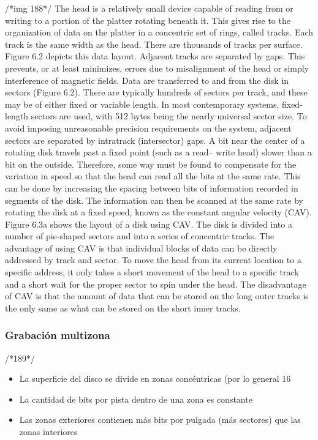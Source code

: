 /*img 188*/
The head is a relatively small device capable of reading from or writing to a portion
of the platter rotating beneath it. This gives rise to the organization of data on the
platter in a concentric set of rings, called tracks. Each track is the same width as the
head. There are thousands of tracks per surface.
Figure 6.2 depicts this data layout. Adjacent tracks are separated by gaps. This
prevents, or at least minimizes, errors due to misalignment of the head or simply
interference of magnetic fields.
Data are transferred to and from the disk in sectors (Figure 6.2). There are
typically hundreds of sectors per track, and these may be of either fixed or variable
length. In most contemporary systems, fixed-length sectors are used, with 512 bytes
being the nearly universal sector size. To avoid imposing unreasonable precision
requirements on the system, adjacent sectors are separated by intratrack (intersector)
gaps.
A bit near the center of a rotating disk travels past a fixed point (such as a read–
write head) slower than a bit on the outside. Therefore, some way must be found
to compensate for the variation in speed so that the head can read all the bits at the
same rate. This can be done by increasing the spacing between bits of information
recorded in segments of the disk. The information can then be scanned at the same
rate by rotating the disk at a fixed speed, known as the constant angular velocity
(CAV). Figure 6.3a shows the layout of a disk using CAV. The disk is divided into
a number of pie-shaped sectors and into a series of concentric tracks. The advantage
of using CAV is that individual blocks of data can be directly addressed by
track and sector. To move the head from its current location to a specific address, it
only takes a short movement of the head to a specific track and a short wait for the
proper sector to spin under the head. The disadvantage of CAV is that the amount
of data that can be stored on the long outer tracks is the only same as what can be
stored on the short inner tracks.

\subsubsection{Grabación multizona}
/*189*/
\begin{itemize}
\item La superficie del disco se divide en zonas concéntricas (por lo general 16
\item La cantidad de bits por pista dentro de una zona es constante
\item Las zonas exteriores contienen más bits por pulgada (más sectores) que las zonas interiores
\end{itemize}

